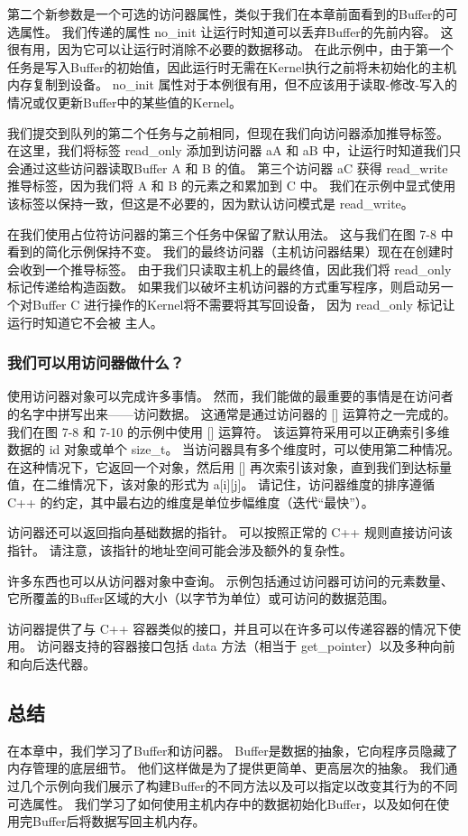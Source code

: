 第二个新参数是一个可选的访问器属性，类似于我们在本章前面看到的Buffer的可选属性。 
我们传递的属性 no\_init 让运行时知道可以丢弃Buffer的先前内容。 这很有用，因为它可以让运行时消除不必要的数据移动。 
在此示例中，由于第一个任务是写入Buffer的初始值，因此运行时无需在Kernel执行之前将未初始化的主机内存复制到设备。 
no\_init 属性对于本例很有用，但不应该用于读取-修改-写入的情况或仅更新Buffer中的某些值的Kernel。

我们提交到队列的第二个任务与之前相同，但现在我们向访问器添加推导标签。 
在这里，我们将标签 read\_only 添加到访问器 aA 和 aB 中，让运行时知道我们只会通过这些访问器读取Buffer A 和 B 的值。 
第三个访问器 aC 获得 read\_write 推导标签，因为我们将 A 和 B 的元素之和累加到 C 中。
我们在示例中显式使用该标签以保持一致，但这是不必要的，因为默认访问模式是 read\_write。

在我们使用占位符访问器的第三个任务中保留了默认用法。 这与我们在图 7-8 中看到的简化示例保持不变。 
我们的最终访问器（主机访问器结果）现在在创建时会收到一个推导标签。 
由于我们只读取主机上的最终值，因此我们将 read\_only 标记传递给构造函数。 
如果我们以破坏主机访问器的方式重写程序，则启动另一个对Buffer C 进行操作的Kernel将不需要将其写回设备，
因为 read\_only 标记让运行时知道它不会被 主人。

\subsubsection{我们可以用访问器做什么？}
使用访问器对象可以完成许多事情。 然而，我们能做的最重要的事情是在访问者的名字中拼写出来——访问数据。 
这通常是通过访问器的 [] 运算符之一完成的。 我们在图 7-8 和 7-10 的示例中使用 [] 运算符。 
该运算符采用可以正确索引多维数据的 id 对象或单个 size\_t。 当访问器具有多个维度时，可以使用第二种情况。 
在这种情况下，它返回一个对象，然后用 [] 再次索引该对象，直到我们到达标量值，在二维情况下，该对象的形式为 a[i][j]。 
请记住，访问器维度的排序遵循 C++ 的约定，其中最右边的维度是单位步幅维度（迭代“最快”）。

访问器还可以返回指向基础数据的指针。 可以按照正常的 C++ 规则直接访问该指针。 
请注意，该指针的地址空间可能会涉及额外的复杂性。

许多东西也可以从访问器对象中查询。 
示例包括通过访问器可访问的元素数量、它所覆盖的Buffer区域的大小（以字节为单位）或可访问的数据范围。

访问器提供了与 C++ 容器类似的接口，并且可以在许多可以传递容器的情况下使用。 
访问器支持的容器接口包括 data 方法（相当于 get\_pointer）以及多种向前和向后迭代器。

\subsection{总结}
在本章中，我们学习了Buffer和访问器。 Buffer是数据的抽象，它向程序员隐藏了内存管理的底层细节。 
他们这样做是为了提供更简单、更高层次的抽象。 
我们通过几个示例向我们展示了构建Buffer的不同方法以及可以指定以改变其行为的不同可选属性。 
我们学习了如何使用主机内存中的数据初始化Buffer，以及如何在使用完Buffer后将数据写回主机内存。

